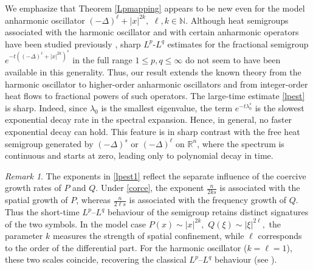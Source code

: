 \documentclass[12pt, reqno]{amsart}
\theoremstyle{definition}
\theoremstyle{remark}
\newtheorem{remark}[theorem]{Remark}
\numberwithin{equation}{section}
\begin{document}
We emphasize that Theorem \ref{Lpmapping} appears to be new even for the model anharmonic oscillator $(-\Delta)^\ell+|x|^{2k},
\,\,
\ell,k\in\mathbb{N}.$
Although heat semigroups associated with the harmonic oscillator and with certain anharmonic operators have been studied previously \cite{than:hs1, CK, CK23}, sharp $L^p$-$L^q$ estimates for the fractional semigroup $e^{-t\left((-\Delta)^\ell+|x|^{2k}\right)^s}$
in the full range $1\leq p,q\leq\infty$ do not seem to have been available in this generality.  Thus, our result extends the known theory from the harmonic oscillator to higher-order anharmonic oscillators and from integer-order heat flows to fractional powers of such operators.  The large-time estimate \eqref{lpest} is sharp. Indeed, since $\lambda_0$ is the smallest eigenvalue, the term $e^{-t\lambda_0^s}$ is the slowest exponential decay rate in the spectral expansion. Hence, in general, no faster exponential decay can hold. This feature is in sharp contrast with the free heat semigroup generated by $(-\Delta)^s$ or $(-\Delta)^\ell$ on $\mathbb{R}^n$, where the spectrum is continuous and starts at zero, leading only to polynomial decay in time.

\begin{remark} The exponents in \eqref{lpest1} reflect the separate influence of the coercive growth rates of $P$ and $Q$. Under \eqref{corce}, the exponent $\frac{n}{2ks}$ is associated with the spatial growth of $P$, whereas $\frac{n}{2\ell s}$ is associated with the frequency growth of $Q$. Thus the short-time $L^p$--$L^q$ behaviour of the semigroup retains distinct signatures of the two symbols. In the model case $P(x)\sim |x|^{2k}, \,\, Q(\xi)\sim |\xi|^{2\ell},$ the parameter $k$ measures the strength of spatial confinement, while $\ell$ corresponds to the order of the differential part. For the harmonic oscillator ($k=\ell=1$), these two scales coincide, recovering the classical $L^p$--$L^q$ behaviour (see \cite{than:hs1}). \end{remark}


\end{document}
